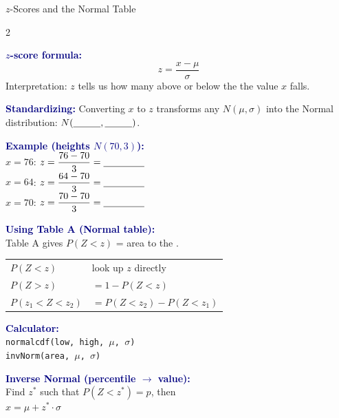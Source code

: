 \documentclass[10pt]{article}
\begin{document}
\boxguard
\begin{notesbox}{$z$-Scores and the Normal Table}
\small
\begin{multicols}{2}

\textbf{\textcolor{navy}{$z$-score formula:}}
\[
  z = \dfrac{x - \mu}{\sigma}
\]
Interpretation: $z$ tells us how many \blank{3cm}
above or below the \blank{1.5cm} the value $x$ falls.

\vspace{5pt}
\textbf{\textcolor{navy}{Standardizing:}} Converting $x$ to $z$ transforms
any $N(\mu, \sigma)$ into the \blank{3cm}
Normal distribution: $N(\blank{1cm},\blank{1cm})$.

\vspace{5pt}
\textbf{\textcolor{navy}{Example (heights $N(70,3)$):}}\\
$x = 76$: $z = \dfrac{76-70}{3} = \blank{1.5cm}$\\[4pt]
$x = 64$: $z = \dfrac{64-70}{3} = \blank{1.5cm}$\\[4pt]
$x = 70$: $z = \dfrac{70-70}{3} = \blank{1.5cm}$

\columnbreak

\textbf{\textcolor{navy}{Using Table A (Normal table):}}\\
Table A gives $P(Z < z)$ = area to the \blank{1.5cm}.

\vspace{4pt}
\renewcommand{\arraystretch}{1.5}
\begin{tabular}{@{}l l@{}}
$P(Z < z)$        & look up $z$ directly \\
$P(Z > z)$        & $= 1 - P(Z < z)$ \\
$P(z_1 < Z < z_2)$ & $= P(Z < z_2) - P(Z < z_1)$ \\
\end{tabular}

\vspace{6pt}
\textbf{\textcolor{navy}{Calculator:}}\\
\texttt{normalcdf(low, high, $\mu$, $\sigma$)}\\
\texttt{invNorm(area, $\mu$, $\sigma$)}

\vspace{6pt}
\textbf{\textcolor{navy}{Inverse Normal (percentile $\to$ value):}}\\
Find $z^*$ such that $P(Z < z^*) = p$, then\\
$x = \mu + z^* \cdot \sigma$

\end{multicols}
\end{notesbox}
\end{document}
